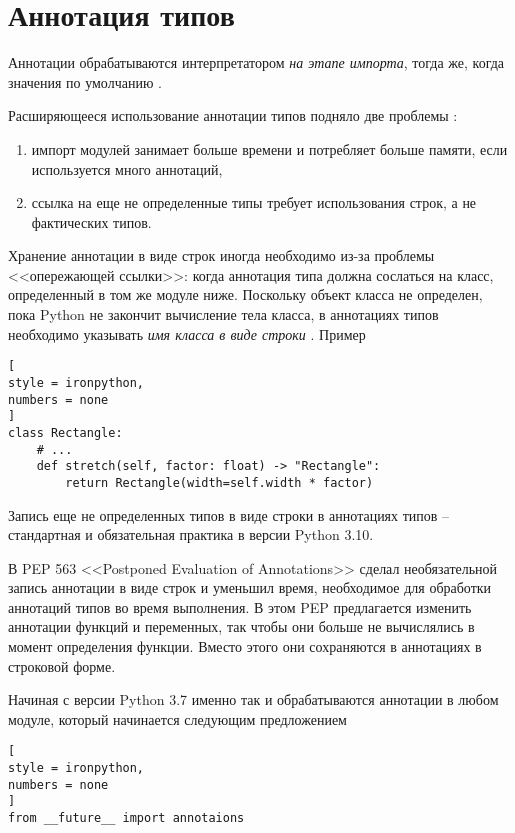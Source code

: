 \documentclass[%
	11pt,
	a4paper,
	utf8,
		]{article}
\begin{document}
\section{Аннотация типов}

Аннотации обрабатываются интерпретатором \emph{на этапе импорта}, тогда же, когда значения по умолчанию \cite[]{ramalho:python-2022}.

Расширяющееся использование аннотации типов подняло две проблемы \cite{ramalho:python-2022}:
\begin{enumerate}
	\item импорт модулей занимает больше времени и потребляет больше памяти, если используется много аннотаций,
	
	\item ссылка на еще не определенные типы требует использования строк, а не фактических типов.
\end{enumerate}

Хранение аннотации в виде строк иногда необходимо из-за проблемы <<опережающей ссылки>>: когда аннотация типа должна сослаться на класс, определенный в том же модуле ниже. Поскольку объект класса не определен, пока Python не закончит вычисление тела класса, в аннотациях типов необходимо указывать \emph{имя класса в виде строки} \cite[]{ramalho:python-2022}. Пример
\begin{lstlisting}[
style = ironpython,
numbers = none
]
class Rectangle:
	# ...
	def stretch(self, factor: float) -> "Rectangle":
		return Rectangle(width=self.width * factor)
\end{lstlisting}

Запись еще не определенных типов в виде строки в аннотациях типов -- стандартная и обязательная практика в версии Python 3.10.

В PEP 563 <<Postponed Evaluation of Annotations>> сделал необязательной запись аннотации в виде строк и уменьшил время, необходимое для обработки аннотаций типов во время выполнения. В этом PEP предлагается изменить аннотации функций и переменных, так чтобы они больше не вычислялись в момент определения функции. Вместо этого они сохраняются в аннотациях в строковой форме.

Начиная с версии Python 3.7 именно так и обрабатываются аннотации в любом модуле, который начинается следующим предложением
\begin{lstlisting}[
style = ironpython,
numbers = none
]
from __future__ import annotaions
\end{lstlisting}
\end{document}
